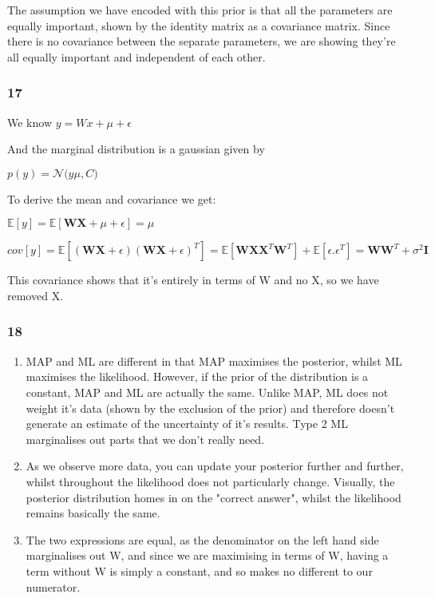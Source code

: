 \documentclass[11pt]{article}
\begin{document}
The assumption we have encoded with this prior is that all the
parameters are equally important, shown by the identity matrix as a
covariance matrix. Since there is no covariance between the separate
parameters, we are showing they're all equally important and independent
of each other.

    \subsubsection*{17}\label{section}

We know \(y = Wx + \mu + \epsilon\)

And the marginal distribution is a gaussian given by

\(p(y) = \mathcal{N}(y\)\textbar{}\(\mu, C)\)

To derive the mean and covariance we get:

\(\mathbb E[y] = \mathbb E[\pmb W\pmb X + \mu + \epsilon] = \mu\)

\(cov[y] = \mathbb E[(\pmb W\pmb X + \epsilon)(\pmb W\pmb X + \epsilon)^T] = \mathbb E[\pmb W\pmb X\pmb X^T\pmb W^T] + \mathbb E[\epsilon.\epsilon^T] = \pmb W\pmb W^T + \sigma^2\pmb I\)

This covariance shows that it's entirely in terms of W and no X, so we
have removed X.

    \subsubsection*{18}\label{section}

\begin{enumerate}
\def\labelenumi{\alph{enumi})}
\item
  MAP and ML are different in that MAP maximises the posterior, whilst
  ML maximises the likelihood. However, if the prior of the distribution
  is a constant, MAP and ML are actually the same. Unlike MAP, ML does
  not weight it's data (shown by the exclusion of the prior) and
  therefore doesn't generate an estimate of the uncertainty of it's
  results. Type 2 ML marginalises out parts that we don't really need.
\item
  As we observe more data, you can update your posterior further and
  further, whilst throughout the likelihood does not particularly
  change. Visually, the posterior distribution homes in on the "correct
  answer", whilst the likelihood remains basically the same.
\item
  The two expressions are equal, as the denominator on the left hand
  side marginalises out W, and since we are maximising in terms of W,
  having a term without W is simply a constant, and so makes no
  different to our numerator.
\end{enumerate}
\end{document}
